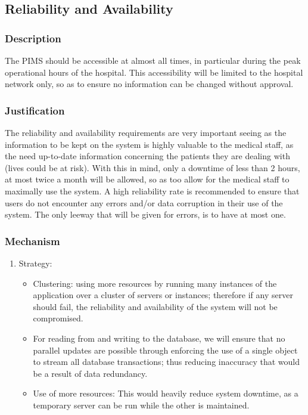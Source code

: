 \subsection{Reliability and Availability}
\subsubsection*{Description}
The PIMS should be accessible at almost all times, in particular during the peak operational hours of the hospital. This accessibility will be limited to the hospital network only, so as to ensure no information can be changed without approval.
		
\subsubsection*{Justification}
The reliability and availability requirements are very important seeing as the information to be kept on the system is highly valuable to the medical staff, as the need up-to-date information concerning the patients they are dealing with (lives could be at risk).							 
With this in mind, only a downtime of less than 2 hours, at most twice a month will be allowed, so as too allow for the medical staff to maximally use the system.
A high reliability rate is recommended to ensure that users do not encounter any errors and/or data corruption in their use of the system. The only leeway that will be given for errors, is to have at most one.
	
	
\subsubsection*{Mechanism}	
\begin{enumerate}
\item Strategy:
	\begin{itemize}
		\item Clustering: using more resources by running many instances of the application over a cluster of servers or instances; therefore if any server should fail, the reliability and availability of the system will not be compromised.
		\item For reading from and writing to the database, we will ensure that no parallel updates are possible through enforcing the use of a single object to stream all database transactions; thus reducing inaccuracy that would be a result of data redundancy.		 
		\item Use of more resources: This would heavily reduce system downtime, as a temporary server can be run while the other is maintained.
\end{itemize}
					
\end{enumerate}
